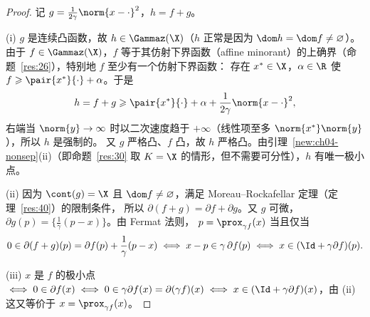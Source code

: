 \begin{proof}
记 $g=\frac1{2\gamma}\norm{x-\cdot}^2$，$h=f+g$。

(i) $g$ 是连续凸函数，故 $h\in\Gammaz(\X)$（$h$ 正常是因为 $\dom h=\dom f\neq\varnothing$）。
由于 $f\in\Gammaz(\X)$，$f$ 等于其仿射下界函数（affine minorant）的上确界（命题~\ref{res:26}），特别地 $f$ 至少有一个仿射下界函数：
存在 $x^*\in\X$，$\alpha\in\R$ 使 $f\geqslant\pair{x^*}{\cdot}+\alpha$。于是
\[
  h=f+g\geqslant\pair{x^*}{\cdot}+\alpha+\frac1{2\gamma}\norm{x-\cdot}^2 ,
\]
右端当 $\norm{y}\to\infty$ 时以二次速度趋于 $+\infty$（线性项至多 $\norm{x^*}\norm{y}$），所以 $h$ 是强制的。
又 $g$ 严格凸、$f$ 凸，故 $h$ 严格凸。由引理~\ref{new:ch04-nonsep}(ii)（即命题~\ref{res:30} 取 $K=\X$ 的情形，但不需要可分性），$h$ 有唯一极小点。

(ii) 因为 $\cont(g)=\X$ 且 $\dom f\neq\varnothing$，满足 Moreau--Rockafellar 定理（定理~\ref{res:40}）的限制条件，
所以 $\partial(f+g)=\partial f+\partial g$。又 $g$ 可微，$\partial g(p)=\{\frac1\gamma(p-x)\}$。由 Fermat 法则，
$p=\prox_{\gamma f}(x)$ 当且仅当
\[
  0\in\partial(f+g)(p)=\partial f(p)+\frac1\gamma(p-x)
  \iff x-p\in\gamma\,\partial f(p)
  \iff x\in(\Id+\gamma\partial f)(p).
\]

(iii) $x$ 是 $f$ 的极小点 $\iff 0\in\partial f(x)\iff 0\in\gamma\partial f(x)=\partial(\gamma f)(x)
\iff x\in(\Id+\gamma\partial f)(x)$，由 (ii) 这又等价于 $x=\prox_{\gamma f}(x)$。
\end{proof}

